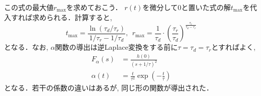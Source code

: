 この式の最大値$r_{\max}$を求めておこう． $r(t)$を微分して0と置いた式の解$t_{\max}$を代入すれば求められる．計算すると, 
\begin{equation}
t_{\max}=\dfrac{\ln(\tau_d/\tau_r)}{1/\tau_r-1/\tau_d},\ \ r_{\max}=\dfrac{1}{\tau_{d}}\cdot \left(\dfrac{\tau_{r}}{\tau_{d}}\right)^{\frac{\tau_{r}}{\tau_d-\tau_{r}}}    
\end{equation}
となる．なお, $\alpha$関数の導出は逆Laplace変換をする前に$\tau=\tau_d=\tau_r$とすればよく, 
\begin{align}
F_\alpha(s)&=\frac{h(0)}{(s+1/\tau)^2}\\
\alpha(t)&=\frac{t}{\tau^2}\exp\left(-\frac{t}{\tau}\right)
\end{align}
となる．若干の係数の違いはあるが, 同じ形の関数が導出された． 
